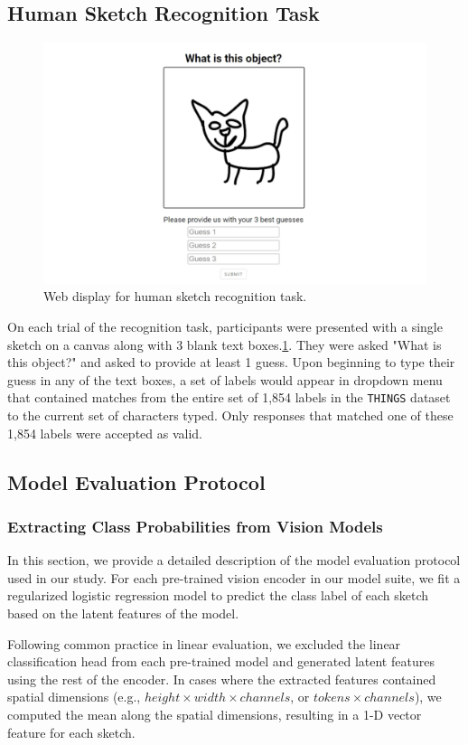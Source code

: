\documentclass{article}
\begin{document}
\subsection{Human Sketch Recognition Task}
\vspace{-1em}
\begin{figure}[ht!]
    \centering
    \includegraphics[width=.75\textwidth]{neurips_figures/recognition_task.png}
    \caption{Web display for human sketch recognition task.}
    \label{fig:recognition_task}
\end{figure}

On each trial of the recognition task, participants were presented with a single sketch on a canvas along with 3 blank text boxes.\ref{fig:recognition_task}. They were asked "What is this object?" and asked to provide at least 1 guess.
Upon beginning to type their guess in any of the text boxes, a set of labels would appear in dropdown menu that contained matches from the entire set of 1,854 labels in the \texttt{THINGS} dataset to the current set of characters typed.
Only responses that matched one of these 1,854 labels were accepted as valid.

\subsection{Model Evaluation Protocol}
\subsubsection{Extracting Class Probabilities from Vision Models}
In this section, we provide a detailed description of the model evaluation protocol used in our study. For each pre-trained vision encoder in our model suite, we fit a regularized logistic regression model to predict the class label of each sketch based on the latent features of the model. 

Following common practice in linear evaluation, we excluded the linear classification head from each pre-trained model and generated latent features using the rest of the encoder. In cases where the extracted features contained spatial dimensions (e.g., $height \times width \times channels$, or $tokens \times channels$), we computed the mean along the spatial dimensions, resulting in a 1-D vector feature for each sketch.
\end{document}
